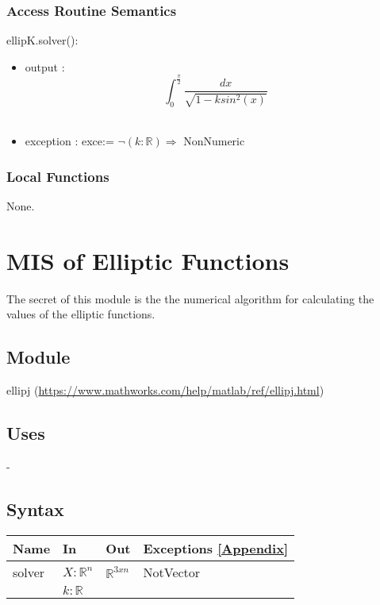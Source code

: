 \documentclass[12pt, titlepage]{article}
\begin{document}
\subsubsection{Access Routine Semantics}

\noindent ellipK.solver():
\begin{itemize}
	\item output : \\
	$$ 
	\int_{0}^{\frac{\pi}{2}} \frac{dx}{\sqrt{1-ksin^{2}(x)}}$$ \\
	\item exception : exce:= $\neg(k : \mathbb{R}) \Rightarrow$ 
	NonNumeric
\end{itemize}

\subsubsection{Local Functions} 

None. 

\newpage

\section{MIS of Elliptic Functions} \label{MELF}

The secret of this module is the the numerical algorithm for calculating the 
values of the elliptic functions.

\subsection{Module}

ellipj (\url{https://www.mathworks.com/help/matlab/ref/ellipj.html})

\subsection{Uses}

- 

\subsection{Syntax}

\begin{center}
	\begin{tabular}{p{2cm} p{4cm} p{4cm} p{3cm}}
		\hline
		\textbf{Name} & \textbf{In} & \textbf{Out} & \textbf{Exceptions} 
		\ref{Appendix}\\
		\hline
		solver & $X : \mathbb{R}^{n}$ & $\mathbb{R}^{3xn}$ & 
		NotVector \\ 
		 & $k : \mathbb{R}$ &  &  \\ 
		\hline
	\end{tabular}
\end{center}
\end{document}
